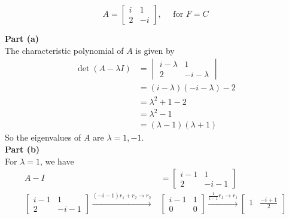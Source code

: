 \documentclass[answers,12pt,addpoints]{exam}
\begin{document}
\begin{questions}
    $$A = \begin{bmatrix}
        i & 1 \\
        2 & -i
    \end{bmatrix}, \quad \text{ for } F = C $$
    \begin{solution}
        \textbf{Part (a)}\\
        The characteristic polynomial of $A$ is given by
        \begin{align*}
            \det(A - \lambda I) &= \begin{vmatrix}
                i - \lambda & 1 \\
                2 & -i - \lambda
            \end{vmatrix}\\
            &= (i - \lambda)(-i - \lambda) - 2\\
            &= \lambda^2 + 1 - 2\\
            &= \lambda^2 - 1\\
            &= (\lambda - 1)(\lambda + 1)
        \end{align*}
        So the eigenvalues of $A$ are $\lambda = 1, -1$.\\
        \textbf{Part (b)}\\
        For $\lambda = 1$, we have
        \begin{align*}
            A - I &= \begin{bmatrix}
                i - 1 & 1 \\
                2 & -i - 1
            \end{bmatrix}\\
            \begin{bmatrix}
                i - 1 & 1 \\
                2 & -i - 1
            \end{bmatrix} \xrightarrow{(-i-1)r_1 + r_2 \to r_2} &\begin{bmatrix}
                i - 1 & 1 \\
                0 & 0
            \end{bmatrix} \xrightarrow{\frac{1}{i-1}r_1 \to r_1} \begin{bmatrix}
                1 & \frac{-i+1}{2} \\

\end{bmatrix}
\end{align*}
\end{solution}
\end{questions}
\end{document}
